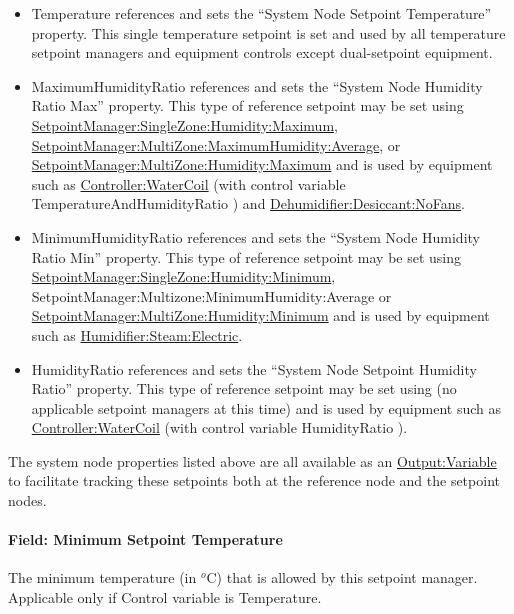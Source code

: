 \begin{itemize}
\item
  Temperature references and sets the ``System Node Setpoint Temperature'' property. This single temperature setpoint is set and used by all temperature setpoint managers and equipment controls except dual-setpoint equipment.
\item
  MaximumHumidityRatio references and sets the ``System Node Humidity Ratio Max'' property. This type of reference setpoint may be set using \hyperref[setpointmanagersinglezonehumiditymaximum]{SetpointManager:SingleZone:Humidity:Maximum}, \hyperref[setpointmanagermultizonemaximumhumidityaverage]{SetpointManager:MultiZone:MaximumHumidity:Average}, or \hyperref[setpointmanagermultizonehumiditymaximum]{SetpointManager:MultiZone:Humidity:Maximum} and is used by equipment such as \hyperref[controllerwatercoil]{Controller:WaterCoil} (with control variable TemperatureAndHumidityRatio ) and \hyperref[dehumidifierdesiccantnofans]{Dehumidifier:Desiccant:NoFans}.
\item
  MinimumHumidityRatio references and sets the ``System Node Humidity Ratio Min'' property. This type of reference setpoint may be set using \hyperref[setpointmanagersinglezonehumidityminimum]{SetpointManager:SingleZone:Humidity:Minimum}, SetpointManager:Multizone:MinimumHumidity:Average or \hyperref[setpointmanagermultizonehumidityminimum]{SetpointManager:MultiZone:Humidity:Minimum} and is used by equipment such as \hyperref[humidifiersteamelectric]{Humidifier:Steam:Electric}.
\item
  HumidityRatio references and sets the ``System Node Setpoint Humidity Ratio'' property. This type of reference setpoint may be set using (no applicable setpoint managers at this time) and is used by equipment such as \hyperref[controllerwatercoil]{Controller:WaterCoil} (with control variable HumidityRatio ).
\end{itemize}

The system node properties listed above are all available as an \hyperref[outputvariable]{Output:Variable} to facilitate tracking these setpoints both at the reference node and the setpoint nodes.

\paragraph{Field: Minimum Setpoint Temperature}\label{field-minimum-setpoint-temperature}

The minimum temperature (in \(^{o}\)C) that is allowed by this setpoint manager. Applicable only if Control variable is Temperature.

